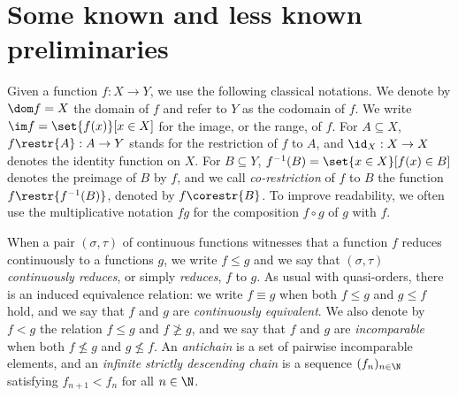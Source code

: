 
\chapter{Some known and less known preliminaries}\label{sectionPrelim}

Given a function $f:X\to Y$, we use the following classical notations. We denote by $\dom f=X$ the domain of $f$ and refer to $Y$ as the codomain of $f$.
We write $\im f =\set{f(x)}[x\in X]$ for the image, or the range, of $f$. 
For $A\subseteq X$, $f\restr{A}:A\to Y$ stands for the restriction of $f$ to $A$, and $\id_{X}:X\to X$ denotes the identity function on $X$.
For $B\subseteq Y$, $f^{-1}(B)=\set{x\in X}[f(x)\in B]$ denotes the preimage of $B$ by $f$, and we call \emph{co-restriction} of $f$ to $B$ the function $f\restr{f^{-1}(B)}$, denoted by $f\corestr{B}$.
To improve readability, we often use the multiplicative notation $fg$ for the composition $f\circ g$ of $g$ with $f$.


When a pair $(\sigma,\tau)$ of continuous functions witnesses that a function $f$ reduces continuously to a functions $g$, we write $f\leq g$ and we say that $(\sigma,\tau)$ \emph{continuously reduces}, or simply \emph{reduces}, $f$ to $g$.
As usual with quasi-orders, there is an induced equivalence relation: we write $f\equiv g$ when both $f\leq g$ and $g\leq f$ hold,
and we say that $f$ and $g$ are \emph{continuously equivalent}.
We also denote by $f<g$ the relation $f\leq g$ and $f\not\geq g$, and we say that $f$ and $g$ are \emph{incomparable} when both $f\not\leq g$ and $g\not\leq f$. 
An \emph{antichain} is a set of pairwise incomparable elements, and an \emph{infinite strictly descending chain} is a sequence $(f_n)_{n\in\N}$
satisfying $f_{n+1}<f_n$ for all $n\in\N$. 





